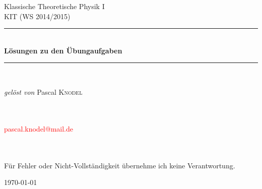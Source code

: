 


\begin{titlepage}
	
	\begin{center}
		
		\textsf{\LARGE Klassische Theoretische Physik I}\\[1.5cm]
		
		\textsc{\Large KIT (WS 2014/2015)}\\[1.25cm]
		
		\newcommand{\HRule}{\rule{\linewidth}{0.25mm}}
		\HRule \\[0.4cm]
		{ \Large \bfseries Lösungen zu den Übungaufgaben}
		\HRule \\[1.5cm]
		
		\begin{minipage}{0.5\textwidth}
			\begin{flushleft} \large
				\emph{gelöst von} \quad Pascal \textsc{Knodel} 
				
				~\\~\\
				
				\textcolor{red}{pascal.knodel@mail.de}
				
				~\\~\\
				
				Für Fehler oder Nicht-Vollständigkeit übernehme ich keine Verantwortung.
				
			\end{flushleft}
		\end{minipage}
		\hfill
		
		
		\vfill
		
		{\large \today}
		
	\end{center}
	
\end{titlepage}